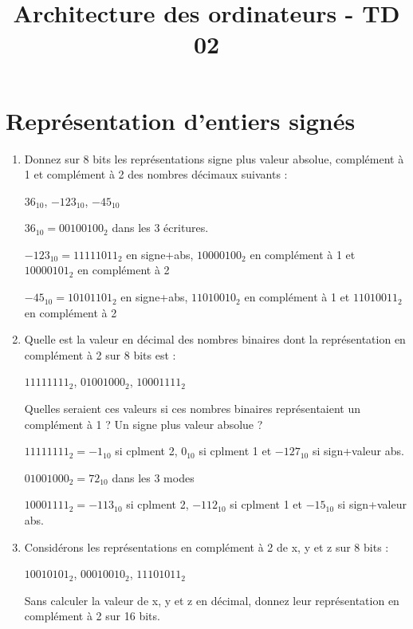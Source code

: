 \documentclass[a4paper,10pt]{exam}
\title{Architecture des ordinateurs - TD 02}
\author{}
\date{}
\begin{document}
\maketitle

\section{Repr\'esentation d'entiers sign\'es}
\begin{enumerate}
\item Donnez sur 8 bits les repr\'esentations signe plus valeur absolue, compl\'ement \`a 1 et compl\'ement \`a 2 des nombres d\'ecimaux suivants :

$36_{10}$, $-123_{10}$, $-45_{10}$

\begin{solution}
$36_{10} = 00100100_{2}$ dans les 3 \'ecritures.

$-123_{10} = 11111011_{2}$ en signe+abs, $10000100_{2}$ en compl\'ement \`a 1 et $10000101_{2}$ en compl\'ement \`a 2

$-45_{10} = 10101101_{2}$ en signe+abs, $11010010_{2}$ en compl\'ement \`a 1 et $11010011_{2}$ en compl\'ement \`a 2

\end{solution}

\item Quelle est la valeur en d\'ecimal des nombres binaires dont la repr\'esentation en compl\'ement \`a 2 sur 8 bits est :

$11111111_{2}$, $01001000_{2}$, $10001111_{2}$

Quelles seraient ces valeurs si ces nombres binaires représentaient un compl\'ement \`a 1 ? Un signe plus valeur absolue ?
\begin{solution}
$11111111_{2} = -1_{10}$ si cplment 2, $0_{10}$ si cplment 1 et $-127_{10}$ si sign+valeur abs.

$01001000_{2} = 72_{10}$ dans les 3 modes

$10001111_{2} = -113_{10}$ si cplment 2, $-112_{10}$ si cplment 1 et $-15_{10}$ si sign+valeur abs.

\end{solution}


\item Consid\'erons les repr\'esentations en compl\'ement \`a 2 de x, y et z sur 8 bits :

$10010101_{2}$, $00010010_{2}$, $11101011_{2}$

Sans calculer la valeur de x, y et z en d\'ecimal, donnez leur repr\'esentation en compl\'ement \`a 2 sur 16 bits.


\end{enumerate}
\end{document}

